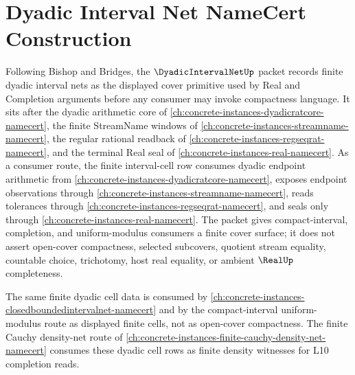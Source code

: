 \chapter{Dyadic Interval Net NameCert Construction}
\label{ch:concrete-instances-dyadic-interval-net-namecert}

Following Bishop and Bridges, the $\DyadicIntervalNetUp$ packet records finite dyadic interval nets as the displayed cover primitive used by Real and Completion arguments before any consumer may invoke compactness language. It sits after the dyadic arithmetic core of \autoref{ch:concrete-instances-dyadicratcore-namecert}, the finite StreamName windows of \autoref{ch:concrete-instances-streamname-namecert}, the regular rational readback of \autoref{ch:concrete-instances-regseqrat-namecert}, and the terminal Real seal of \autoref{ch:concrete-instances-real-namecert}. As a consumer route, the finite interval-cell row consumes dyadic endpoint arithmetic from \autoref{ch:concrete-instances-dyadicratcore-namecert}, exposes endpoint observations through \autoref{ch:concrete-instances-streamname-namecert}, reads tolerances through \autoref{ch:concrete-instances-regseqrat-namecert}, and seals only through \autoref{ch:concrete-instances-real-namecert}. The packet gives compact-interval, completion, and uniform-modulus consumers a finite cover surface; it does not assert open-cover compactness, selected subcovers, quotient stream equality, countable choice, trichotomy, host real equality, or ambient $\RealUp$ completeness.

The same finite dyadic cell data is consumed by \autoref{ch:concrete-instances-closedboundedintervalnet-namecert} and by the compact-interval uniform-modulus route as displayed finite cells, not as open-cover compactness. The finite Cauchy density-net route of \autoref{ch:concrete-instances-finite-cauchy-density-net-namecert} consumes these dyadic cell rows as finite density witnesses for L10 completion reads.

